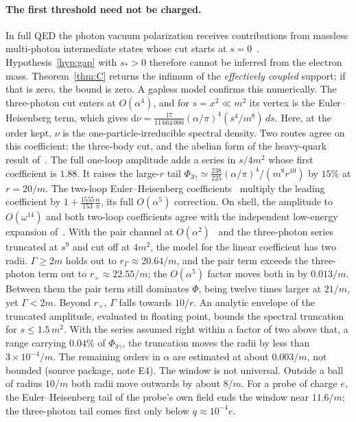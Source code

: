 \documentclass[11pt]{article}
\theoremstyle{definition}
\theoremstyle{remark}
\newcommand{\dnu}{\mathrm{d}\nu}
\begin{document}
\paragraph{The first threshold need not be charged.}
In full QED the photon vacuum polarization receives contributions from
massless multi-photon intermediate states whose cut starts at
$s=0$~\cite{beneke_ruizfemenia_2016}. Hypothesis~\ref{hyp:gap} with
$s_{*}>0$ therefore cannot be inferred from the electron mass.
Theorem~\ref{thm:C} returns the infimum of the \emph{effectively coupled}
support; if that is zero, the bound is zero. A gapless model confirms this
numerically. The three-photon cut enters at $O(\alpha^{4})$, and for
$s=x^{2}\ll m^{2}$ its vertex is the Euler--Heisenberg term, which gives
$\dnu=\frac{17}{11\,664\,000}(\alpha/\pi)^{4}(s^{4}/m^{8})\,ds$. Here, at the
order kept, $\nu$ is the one-particle-irreducible spectral density. Two routes
agree on this coefficient: the three-body cut, and the abelian form of the
heavy-quark result of~\cite{groote_pivovarov_2001}. The full one-loop
amplitude adds a series in $s/4m^{2}$ whose first coefficient is $1.88$. It
raises the large-$r$ tail
$\Phi_{3\gamma}\simeq\frac{238}{225}(\alpha/\pi)^{4}/(m^{8}r^{10})$ by $15\%$
at $r=20/m$. The two-loop Euler--Heisenberg
coefficients~\cite{dunne_2004} multiply the leading coefficient by
$1+\frac{1555}{153}\frac{\alpha}{\pi}$, its full $O(\alpha^{5})$ correction.
On shell, the amplitude to $O(\omega^{14})$ and both two-loop coefficients agree
with the independent low-energy expansion of~\cite{abdulhameed_chaubey_shao_2026}.
With the pair channel at
$O(\alpha^{2})$~\cite{laporta_jentschura_2024} and the three-photon series
truncated at $s^{9}$ and cut off at $4m^{2}$, the model for the linear coefficient
has two radii. $\Gamma\ge2m$ holds out to $r_\Gamma\approx20.64/m$, and the
pair term exceeds the three-photon term out to $r_\times\approx22.55/m$; the
$O(\alpha^{5})$ factor moves both in by $0.013/m$.
Between them the pair term still dominates $\Phi$, being twelve times larger
at $21/m$, yet $\Gamma<2m$. Beyond $r_\times$, $\Gamma$ falls towards $10/r$.
An analytic envelope of the truncated amplitude, evaluated in floating
point, bounds the spectral truncation for $s\le1.5\,m^{2}$. With the series
assumed right within a factor of two above that, a range carrying $0.04\%$ of
$\Phi_{3\gamma}$, the truncation moves the radii by less than $3\times10^{-4}/m$.
The remaining orders in $\alpha$ are estimated at about $0.003/m$, not bounded
(source package, note E4). The window is not universal. Outside a ball of
radius $10/m$ both radii move outwards by about $8/m$. For a probe of charge
$e$, the Euler--Heisenberg tail of the probe's own field ends the window near
$11.6/m$; the three-photon tail comes first only below $q\approx10^{-4}e$.
\end{document}

